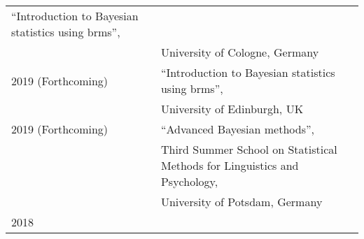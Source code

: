\documentclass[]{article}
\begin{document}
\begin{longtable}[]{@{}ll@{}}
\begin{minipage}[t]{0.69\columnwidth}
``Introduction to Bayesian statistics using brms'',\strut
\end{minipage}\tabularnewline
\begin{minipage}[t]{0.25\columnwidth}\raggedright
\strut
\end{minipage} & \begin{minipage}[t]{0.69\columnwidth}\raggedright
University of Cologne, Germany\vspace{.1cm}\strut
\end{minipage}\tabularnewline
\begin{minipage}[t]{0.25\columnwidth}\raggedright
2019 (Forthcoming)\strut
\end{minipage} & \begin{minipage}[t]{0.69\columnwidth}\raggedright
``Introduction to Bayesian statistics using brms'',\strut
\end{minipage}\tabularnewline
\begin{minipage}[t]{0.25\columnwidth}\raggedright
\strut
\end{minipage} & \begin{minipage}[t]{0.69\columnwidth}\raggedright
University of Edinburgh, UK\vspace{.1cm}\strut
\end{minipage}\tabularnewline
\begin{minipage}[t]{0.25\columnwidth}\raggedright
2019 (Forthcoming)\strut
\end{minipage} & \begin{minipage}[t]{0.69\columnwidth}\raggedright
``Advanced Bayesian methods'',\strut
\end{minipage}\tabularnewline
\begin{minipage}[t]{0.25\columnwidth}\raggedright
\strut
\end{minipage} & \begin{minipage}[t]{0.69\columnwidth}\raggedright
Third Summer School on Statistical Methods for Linguistics and
Psychology,\strut
\end{minipage}\tabularnewline
\begin{minipage}[t]{0.25\columnwidth}\raggedright
\strut
\end{minipage} & \begin{minipage}[t]{0.69\columnwidth}\raggedright
University of Potsdam, Germany\vspace{.1cm}\strut
\end{minipage}\tabularnewline
\begin{minipage}[t]{0.25\columnwidth}\raggedright
2018\strut
\end{minipage} & \begin{minipage}[t]{0.69\columnwidth}\raggedright

\end{minipage}
\end{longtable}
\end{document}

